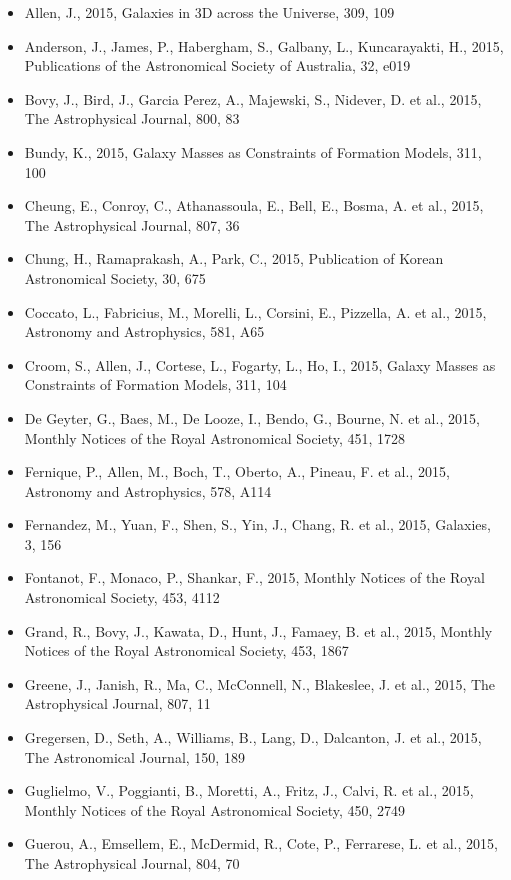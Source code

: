 \documentclass{letter}
\begin{document}
\begin{enumerate}
\begin{itemize}
\item Allen, J., 2015, Galaxies in 3D across the Universe, 309, 109
\item Anderson, J., James, P., Habergham, S., Galbany, L., Kuncarayakti, H., 2015, Publications of the Astronomical Society of Australia, 32, e019
\item Bovy, J., Bird, J., Garcia Perez, A., Majewski, S., Nidever, D. et al., 2015, The Astrophysical Journal, 800, 83
\item Bundy, K., 2015, Galaxy Masses as Constraints of Formation Models, 311, 100
\item Cheung, E., Conroy, C., Athanassoula, E., Bell, E., Bosma, A. et al., 2015, The Astrophysical Journal, 807, 36
\item Chung, H., Ramaprakash, A., Park, C., 2015, Publication of Korean Astronomical Society, 30, 675
\item Coccato, L., Fabricius, M., Morelli, L., Corsini, E., Pizzella, A. et al., 2015, Astronomy and Astrophysics, 581, A65
\item Croom, S., Allen, J., Cortese, L., Fogarty, L., Ho, I., 2015, Galaxy Masses as Constraints of Formation Models, 311, 104
\item De Geyter, G., Baes, M., De Looze, I., Bendo, G., Bourne, N. et al., 2015, Monthly Notices of the Royal Astronomical Society, 451, 1728
\item Fernique, P., Allen, M., Boch, T., Oberto, A., Pineau, F. et al., 2015, Astronomy and Astrophysics, 578, A114
\item Fernandez, M., Yuan, F., Shen, S., Yin, J., Chang, R. et al., 2015, Galaxies, 3, 156
\item Fontanot, F., Monaco, P., Shankar, F., 2015, Monthly Notices of the Royal Astronomical Society, 453, 4112
\item Grand, R., Bovy, J., Kawata, D., Hunt, J., Famaey, B. et al., 2015, Monthly Notices of the Royal Astronomical Society, 453, 1867
\item Greene, J., Janish, R., Ma, C., McConnell, N., Blakeslee, J. et al., 2015, The Astrophysical Journal, 807, 11
\item Gregersen, D., Seth, A., Williams, B., Lang, D., Dalcanton, J. et al., 2015, The Astronomical Journal, 150, 189
\item Guglielmo, V., Poggianti, B., Moretti, A., Fritz, J., Calvi, R. et al., 2015, Monthly Notices of the Royal Astronomical Society, 450, 2749
\item Guerou, A., Emsellem, E., McDermid, R., Cote, P., Ferrarese, L. et al., 2015, The Astrophysical Journal, 804, 70

\end{itemize}
\end{enumerate}
\end{document}
